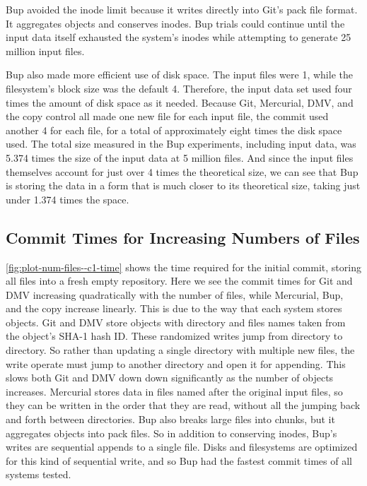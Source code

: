 Bup avoided the \gls{inode} limit because it writes directly into Git's pack file format.
It aggregates objects and conserves inodes.
Bup trials could continue until the input data itself exhausted the system's \glspl{inode} while attempting to generate \num{25} million input files.

Bup also made more efficient use of disk space.
The input files were \SI{1}{\kib}, while the filesystem's block size was the default \SI{4}{\kib}.
Therefore, the input data set used four times the amount of disk space as it needed.
Because Git, Mercurial, DMV, and the copy control all made one new file for each input file, the commit used another \SI{4}{\kib} for each file, for a total of approximately eight times the disk space used.
The total size measured in the Bup experiments, including input data, was \num{5.374} times the size of the input data at \num{5} million files.
And since the input files themselves account for just over \num{4} times the theoretical size, we can see that Bup is storing the data in a form that is much closer to its theoretical size, taking just under \num{1.374} times the space.

%


\subsection{Commit Times for Increasing Numbers of Files}

\autoref{fig:plot-num-files--c1-time} shows the time required for the initial \gls{commit}, storing all files into a fresh empty \gls{repository}.
Here we see the commit times for Git and DMV increasing quadratically with the number of files, while Mercurial, Bup, and the copy increase linearly.
This is due to the way that each system stores objects.
Git and DMV store objects with directory and files names taken from the object's SHA-1 hash ID.
These randomized writes jump from directory to directory.
So rather than updating a single directory with multiple new files, the write operate must jump to another directory and open it for appending.
This slows both Git and DMV down down significantly as the number of objects increases.
Mercurial stores data in files named after the original input files, so they can be written in the order that they are read, without all the jumping back and forth between directories.
Bup also breaks large files into chunks, but it aggregates objects into pack files.
So in addition to conserving inodes, Bup's writes are sequential appends to a single file.
Disks and filesystems are optimized for this kind of sequential write, and so Bup had the fastest commit times of all systems tested.


